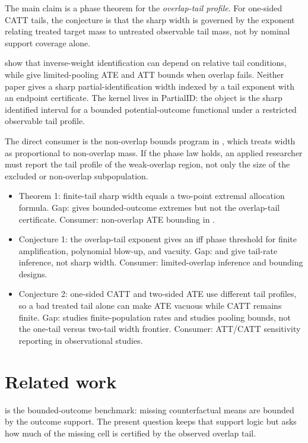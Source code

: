 \documentclass[11pt]{article}
\theoremstyle{definition}
\theoremstyle{plain}
\theoremstyle{remark}
\begin{document}
The main claim is a phase theorem for the \emph{overlap-tail profile}.  For one-sided CATT tails, the conjecture is that the sharp width is governed by the exponent relating treated target mass to untreated observable tail mass, not by nominal support coverage alone.

\citet[p.~2021]{KhanTamer2010IrregularIdentification} show that inverse-weight identification can depend on relative tail conditions, while \citet[abstract]{LeeWeidner2026LimitedPoolingBounds} give limited-pooling ATE and ATT bounds when overlap fails.  Neither paper gives a sharp partial-identification width indexed by a tail exponent with an endpoint certificate.  The kernel lives in PartialID: the object is the sharp identified interval for a bounded potential-outcome functional under a restricted observable tail profile.

The direct consumer is the non-overlap bounds program in \citet{SusmannMcCleanDiaz2025NonOverlapATEBounds}, which treats width as proportional to non-overlap mass.  If the phase law holds, an applied researcher must report the tail profile of the weak-overlap region, not only the size of the excluded or non-overlap subpopulation.

\begin{itemize}[leftmargin=*]
\item Theorem 1: finite-tail sharp width equals a two-point extremal allocation formula. Gap: \citet{Manski1990NonparametricBounds} gives bounded-outcome extremes but not the overlap-tail certificate. Consumer: non-overlap ATE bounding in \citet{SusmannMcCleanDiaz2025NonOverlapATEBounds}.
\item Conjecture 1: the overlap-tail exponent gives an iff phase threshold for finite amplification, polynomial blow-up, and vacuity. Gap: \citet{KhanTamer2010IrregularIdentification} and \citet{HeilerKazak2021ExtremePropensity} give tail-rate inference, not sharp width. Consumer: limited-overlap inference and bounding designs.
\item Conjecture 2: one-sided CATT and two-sided ATE use different tail profiles, so a bad treated tail alone can make ATE vacuous while CATT remains finite. Gap: \citet{HongLeungLi2020FinitePopulationLimitedOverlap} studies finite-population rates and \citet{LeeWeidner2026LimitedPoolingBounds} studies pooling bounds, not the one-tail versus two-tail width frontier. Consumer: ATT/CATT sensitivity reporting in observational studies.
\end{itemize}

\section{Related work}
\citet{Manski1990NonparametricBounds} is the bounded-outcome benchmark: missing counterfactual means are bounded by the outcome support.  The present question keeps that support logic but asks how much of the missing cell is certified by the observed overlap tail.
\end{document}
